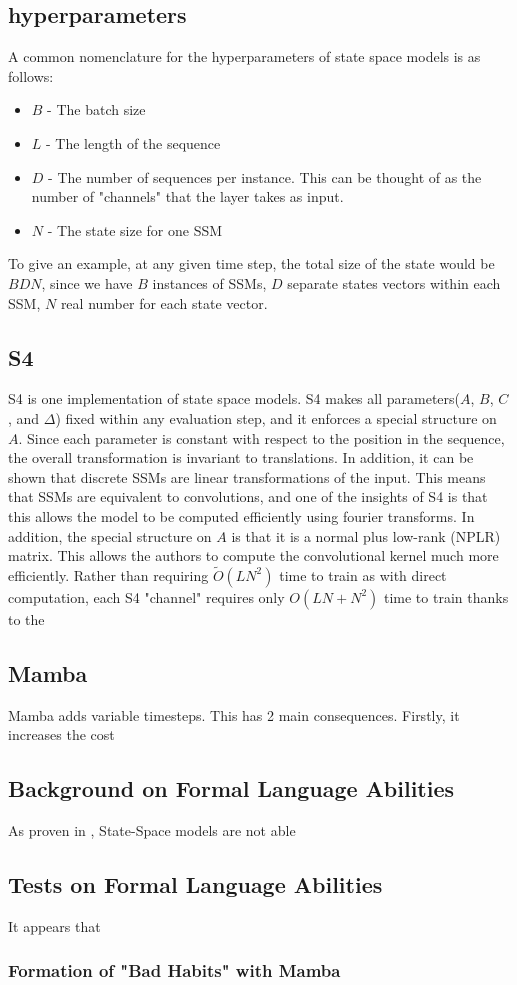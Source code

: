 \subsection{hyperparameters}
A common nomenclature for the hyperparameters of state space models is as
follows:
\begin{itemize}
    \item $B$ - The batch size
    \item $L$ - The length of the sequence
    \item $D$ - The number of sequences per instance. This can be thought of as
    the number of "channels" that the layer takes as input.
    \item $N$ - The state size for one SSM
\end{itemize}
To give an example, at any given time step, the total size of the state would be
$BDN$, since we have $B$ instances of SSMs, $D$ separate states vectors within
each SSM, $N$ real number for each state vector.

\subsection{S4}
S4\cite{gu2022efficiently} is one implementation of state space models.
S4 makes all parameters($A$, $B$, $C$, and $\Delta$) fixed within any evaluation
step, and it enforces a special structure on $A$.
Since each parameter is constant with respect to the position in the sequence,
the overall transformation is invariant to translations.
In addition, it can be shown that discrete SSMs are linear transformations of
the input.
This means that SSMs are equivalent to convolutions, and one of the insights of
S4 is that this allows the model to be computed efficiently using fourier
transforms.
In addition, the special structure on $A$ is that it is a normal plus low-rank
(NPLR) matrix. This allows the authors to compute the convolutional kernel much
more efficiently.
Rather than requiring $\tilde O(LN^2)$ time to train as with direct computation,
each S4 "channel" requires only $O(LN + N^2)$ time to train thanks to the
\subsection{Mamba}
Mamba\cite{mamba} adds variable timesteps. This has 2 main consequences.
Firstly, it increases the cost 

\subsection{Background on Formal Language Abilities}
As proven in \cite{ssmformal}, State-Space models are not able 

\subsection{Tests on Formal Language Abilities}
It appears that 

\subsubsection{Formation of "Bad Habits" with Mamba}

